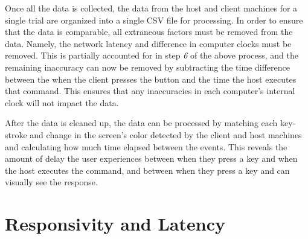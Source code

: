 \noindent
Once all the data is collected, the data from the host and client machines for a single trial are organized into a single CSV file for processing.
In order to ensure that the data is comparable, all extraneous factors must be removed from the data.
Namely, the network latency and difference in computer clocks must be removed.
This is partially accounted for in step \emph{6} of the above process, and the remaining inaccuracy can now be removed by subtracting the time difference between the when the client presses the button and the time the host executes that command.
This ensures that any inaccuracies in each computer's internal clock will not impact the data.

After the data is cleaned up, the data can be processed by matching each key-stroke and change in the screen's color detected by the client and host machines and calculating how much time elapsed between the events.
This reveals the amount of delay the user experiences between when they press a key and when the host executes the command, and between when they press a key and can visually see the response.


\section{Responsivity and Latency}

\todosection

